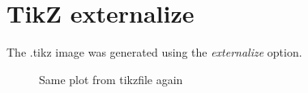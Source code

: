 

\section{TikZ externalize}

The .tikz image was generated using the \emph{externalize} option.

\begin{figure}[htbp]
    \caption{Same plot from tikzfile again}
    \label{tikz:fig:example:1}
\end{figure}

